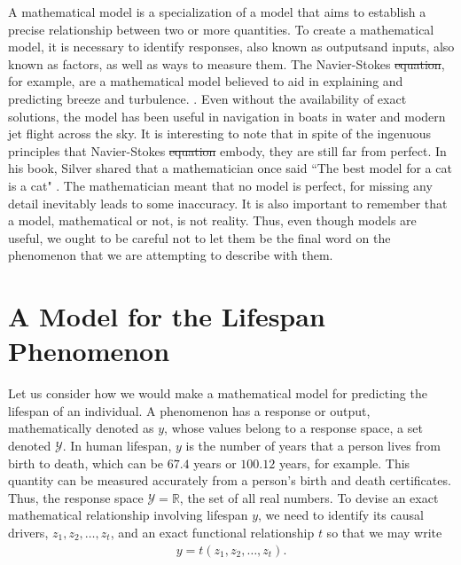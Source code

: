 \documentclass[12pt]{article}
\providecommand{\DIFaddtex}[1]{{\protect\color{blue}\uwave{#1}}} %
\providecommand{\DIFdeltex}[1]{{\protect\color{red}\sout{#1}}}                      %
\providecommand{\DIFaddbegin}{} %
\providecommand{\DIFaddend}{} %
\providecommand{\DIFdelbegin}{} %
\providecommand{\DIFdelend}{} %
\providecommand{\DIFadd}[1]{\texorpdfstring{\DIFaddtex{#1}}{#1}} %
\providecommand{\DIFdel}[1]{\texorpdfstring{\DIFdeltex{#1}}{}} %
\begin{document}
	A mathematical model is a specialization of a model that aims to establish a
	precise relationship between two or more quantities. To create a mathematical model,
	it is necessary to identify responses, also known as outputs\DIFaddbegin \DIFadd{, }\DIFaddend and inputs, also known
	as factors, as well as ways to measure them. The Navier-Stokes \DIFdelbegin \DIFdel{equation}\DIFdelend \DIFaddbegin \DIFadd{equations}\DIFaddend , for example, 
	are a mathematical model believed to aid in explaining and predicting breeze and turbulence.
	\cite{Clay-navier-stokes}. Even without the availability of exact solutions, the model has
	been useful in navigation in boats in water and modern jet flight across the sky.
	It is interesting to note that in spite of the ingenuous principles
	that Navier-Stokes \DIFdelbegin \DIFdel{equation }\DIFdelend \DIFaddbegin \DIFadd{equations }\DIFaddend embody, they are still far from perfect.
	In his book, Silver shared that a mathematician once said ``The best model for a cat is a cat"
	\cite{Silver-signal-and-noise}. The mathematician meant that no model is perfect, for
	missing any detail inevitably leads to some inaccuracy. It is also important
	to remember that a model, mathematical or not, is not reality. Thus, even though
	models are useful, we ought to be careful not to let them be the final word on
	the phenomenon that we are attempting to describe with them.

	\section{A Model for the Lifespan Phenomenon}

	Let us consider how we would make a mathematical model for predicting the lifespan
	of an individual. A phenomenon has a response or output, mathematically denoted as $y$,
	whose values belong to a response space, a set denoted $\mathcal{Y}$. In human lifespan,
	$y$ is the number of years that a person lives from birth to death, which can be $67.4$ years
	or $100.12$ years, for example. This quantity can be measured accurately from a person's birth
	and death certificates.	 Thus, the response space $\mathcal{Y}=\mathbb{R}$, the set of all
	real numbers. To devise an exact mathematical relationship involving lifespan $y$,
	we need to identify its causal drivers, $z_1,z_2,\ldots,z_t$, and an exact functional
	relationship $t$ so that we may write
	\begin{align*}
		y = t(z_1,z_2,\ldots,z_t).
	\end{align*}
\end{document}
